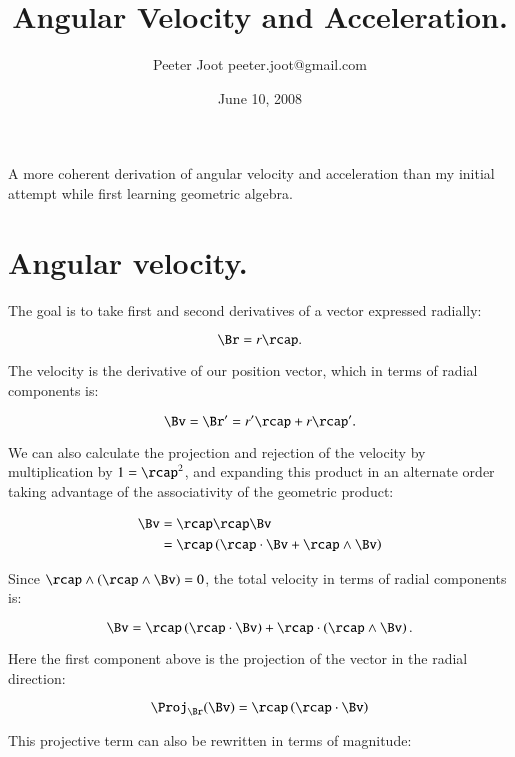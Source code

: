 \documentclass{article}      %
\title{ Angular Velocity and Acceleration. } %
\author{Peeter Joot \quad peeter.joot@gmail.com}         %
\date{June 10, 2008}        %
\begin{document}

\maketitle{}

A more coherent derivation of angular velocity and acceleration than
my initial attempt while first learning geometric algebra.

\section{ Angular velocity. }

The goal is to take first and second derivatives of a vector expressed radially:

\begin{equation}
\Br = r \rcap.
\end{equation}

The velocity is the derivative of our position vector, which in terms of radial components is:

\begin{equation}\label{eqn:velocityasrcapprime}
\Bv = \Br' = r' \rcap + r \rcap'.
\end{equation}

We can also calculate the projection and rejection of the velocity by multiplication by $1 = \rcap^2$, and expanding
this product in an alternate order taking advantage of the associativity of the geometric product:

\begin{align*}
\Bv &= \rcap \rcap \Bv \\
    &= \rcap \left ( \rcap \cdot \Bv + \rcap \wedge \Bv \right) \\
\end{align*}

Since $\rcap \wedge (\rcap \wedge \Bv) = 0$, the total velocity in terms of radial components is:

\begin{equation}\label{eqn:velocityprojrej}
\Bv = \rcap \left(\rcap \cdot \Bv\right) + \rcap \cdot \left(\rcap \wedge \Bv\right).
\end{equation}

Here the first component above is the projection of the vector in the radial direction:

\[
\Proj_{\Br}(\Bv) = \rcap \left(\rcap \cdot \Bv\right)
\]

This projective term can also be rewritten in terms of magnitude:
\end{document}

